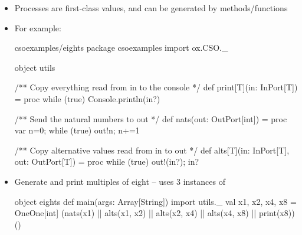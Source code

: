 \documentclass{concdistfoils}
\begin{document}
\begin{slide}
\begin{itemize}
\item Processes are first-class values, and can be generated by methods/functions
\item For example: 
\begin{obj}{csoexamples/eights}
package csoexamples
import  ox.CSO._ 

object utils
{ /** Copy everything read from in to the console */
  def print[T](in: InPort[T]) = proc { while (true) { Console.println(in?) }}   
  
  /** Send the natural numbers to out */
  def nats(out: OutPort[int]) = proc { var n=0; while (true) { out!n; n+=1 }} 
  
  /** Copy alternative values read from in to out */
  def alts[T](in: InPort[T], out: OutPort[T]) =
      proc { while (true) { out!(in?); in? }} 
}

\end{obj}
\end{itemize}
\end{slide}

\begin{slide}
\begin{itemize}
\item Generate and print multiples of eight -- uses 3 instances of 
\begin{obj}{}
object eights
{ def main(args: Array[String])
  { import utils._
    val x1, x2, x4, x8 = OneOne[int]
    (nats(x1) || alts(x1, x2) || alts(x2, x4) || alts(x4, x8) || print(x8))()
  }
}
\end{obj}
\end{itemize}
\end{slide}
\end{document}
